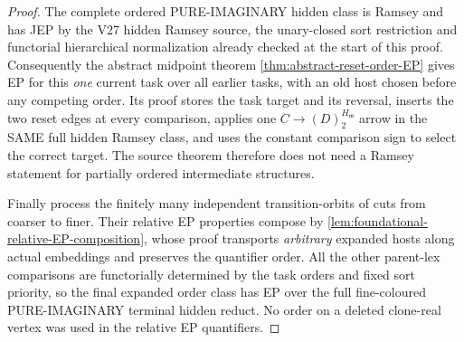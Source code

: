 \begin{proof}
The complete ordered PURE-IMAGINARY
hidden class is Ramsey and has JEP by
the V27 hidden Ramsey source, the
unary-closed sort restriction and
functorial hierarchical normalization
already checked at the start of this proof.
Consequently the abstract midpoint
theorem
\cref{thm:abstract-reset-order-EP}
gives EP for this \emph{one} current
task over all earlier tasks, with an old
host chosen before any competing order.
Its proof stores the task target and
its reversal, inserts the two reset
edges at every comparison, applies one
\(
 C\longrightarrow(D)^{H_{\mathfrak m}}_2
\)
arrow in the SAME full hidden Ramsey
class, and uses the constant comparison
sign to select the correct target.
The source theorem therefore does not
need a Ramsey statement for partially
ordered intermediate structures.

Finally process the finitely many
independent transition-orbits of cuts
from coarser to finer. Their relative
EP properties compose by
\cref{lem:foundational-relative-EP-composition},
whose proof transports \emph{arbitrary}
expanded hosts along actual embeddings
and preserves the quantifier order.
All the other parent-lex comparisons
are functorially determined by the
task orders and fixed sort priority,
so the final expanded order class
has EP over the full fine-coloured
PURE-IMAGINARY terminal hidden reduct.
No order on a deleted clone-real vertex
was used in the relative EP quantifiers.
\end{proof}

